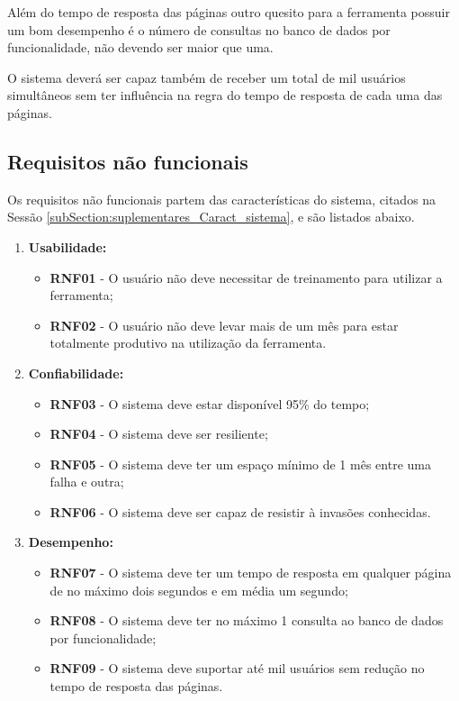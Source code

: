 	Além do tempo de resposta das páginas outro quesito para a ferramenta possuir um bom desempenho é o número de consultas no banco de dados por funcionalidade, não devendo ser maior que uma.

	O sistema deverá ser capaz também de receber um total de mil usuários simultâneos sem ter influência na regra do tempo de resposta de cada uma das páginas.

\subsection{Requisitos não funcionais}

	Os requisitos não funcionais partem das características do sistema, citados na Sessão \ref{subSection:suplementares_Caract_sistema}, e são listados abaixo. 

	\begin{enumerate}
		\item \textbf{Usabilidade:}
			\begin{itemize}
				\item \textbf{RNF01} - O usuário não deve necessitar de treinamento para utilizar a ferramenta;
				\item \textbf{RNF02} - O usuário não deve levar mais de um mês para estar totalmente produtivo na utilização da ferramenta.
			\end{itemize}
		\item \textbf{Confiabilidade:}
			\begin{itemize}
				\item \textbf{RNF03} - O sistema deve estar disponível 95\% do tempo;
				\item \textbf{RNF04} - O sistema deve ser resiliente;
				\item \textbf{RNF05} - O sistema deve ter um espaço mínimo de 1 mês entre uma falha e outra;
				\item \textbf{RNF06} - O sistema deve ser capaz de resistir à invasões conhecidas.
			\end{itemize}
		\item \textbf{Desempenho:}
			\begin{itemize}
				\item \textbf{RNF07} - O sistema deve ter um tempo de resposta em qualquer página de no máximo dois segundos e em média um segundo;
				\item \textbf{RNF08} - O sistema deve ter no máximo 1 consulta ao banco de dados por funcionalidade;
				\item \textbf{RNF09} - O sistema deve suportar até mil usuários sem redução no tempo de resposta das páginas.
			\end{itemize}
	\end{enumerate}